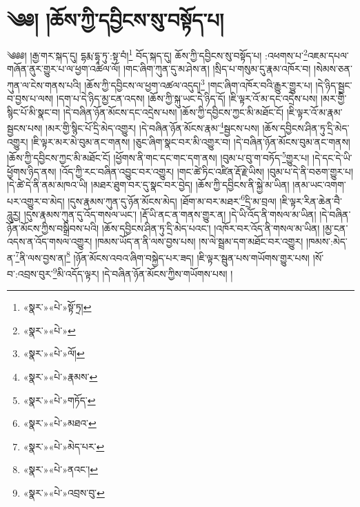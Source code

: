 \chapter{༄༅། །ཆོས་ཀྱི་དབྱིངས་སུ་བསྟོད་པ།}༄༅༅། །རྒྱ་གར་སྐད་དུ། དྷརྨ་དྷཱ་ཏུ་:སྟ་བཾ།\footnote{«སྣར་»«པེ་»སྟོ་ཏྲ།} བོད་སྐད་དུ། ཆོས་ཀྱི་དབྱིངས་སུ་བསྟོད་པ། :འཕགས་པ་\footnote{«སྣར་»«པེ་»}འཇམ་དཔལ་གཞོན་ནུར་གྱུར་པ་ལ་ཕྱག་འཚལ་ལོ། །གང་ཞིག་ཀུན་དུ་མ་ཤེས་ན། །སྲིད་པ་གསུམ་དུ་རྣམ་འཁོར་བ། །སེམས་ཅན་ཀུན་ལ་ངེས་གནས་པའི། །ཆོས་ཀྱི་དབྱིངས་ལ་ཕྱག་འཚལ་འདུད།\footnote{«སྣར་»«པེ་»ལོ།} །གང་ཞིག་འཁོར་བའི་རྒྱུར་གྱུར་པ། །དེ་ཉིད་སྦྱང་བ་བྱས་པ་ལས། །དག་པ་དེ་ཉིད་མྱ་ངན་འདས། །ཆོས་ཀྱི་སྐུ་ཡང་དེ་ཉིད་དོ། །ཇི་ལྟར་འོ་མ་དང་འདྲེས་པས། །མར་གྱི་སྙིང་པོ་མི་སྣང་བ། །དེ་བཞིན་ཉོན་མོངས་དང་འདྲེས་པས། །ཆོས་ཀྱི་དབྱིངས་ཀྱང་མི་མཐོང་ངོ། །ཇི་ལྟར་འོ་མ་རྣམ་སྦྱངས་པས། །མར་གྱི་སྙིང་པོ་དྲི་མེད་འགྱུར། །དེ་བཞིན་ཉོན་མོངས་རྣམ་\footnote{«སྣར་»«པེ་»རྣམས་}སྦྱངས་པས། །ཆོས་དབྱིངས་ཤིན་ཏུ་དྲི་མེད་འགྱུར། །ཇི་ལྟར་མར་མེ་བུམ་ནང་གནས། །ཅུང་ཞིག་སྣང་བར་མི་འགྱུར་བ། །དེ་བཞིན་ཉོན་མོངས་བུམ་ནང་གནས། །ཆོས་ཀྱི་དབྱིངས་ཀྱང་མི་མཐོང་ངོ། །ཕྱོགས་ནི་གང་དང་གང་དག་ནས། །བུམ་པ་བུ་ག་བཏོད་\footnote{«སྣར་»«པེ་»གཏོད་}གྱུར་པ། །དེ་དང་དེ་ཡི་ཕྱོགས་ཉིད་ནས། །འོད་ཀྱི་རང་བཞིན་འབྱུང་བར་འགྱུར། །གང་ཚེ་ཏིང་འཛིན་རྡོ་རྗེ་ཡིས། །བུམ་པ་དེ་ནི་བཅག་གྱུར་པ། །དེ་ཚེ་དེ་ནི་ནམ་མཁའ་ཡི། །མཐར་ཐུག་བར་དུ་སྣང་བར་བྱེད། །ཆོས་ཀྱི་དབྱིངས་ནི་སྐྱེ་མ་ཡིན། །ནམ་ཡང་འགག་པར་འགྱུར་བ་མེད། །དུས་རྣམས་ཀུན་དུ་ཉོན་མོངས་མེད། །ཐོག་མ་བར་མཐར་\footnote{«སྣར་»«པེ་»མཐའ་}དྲི་མ་བྲལ། །ཇི་ལྟར་རིན་ཆེན་བཻ་ཌཱུརྱ། །དུས་རྣམས་ཀུན་དུ་འོད་གསལ་ཡང་། །རྡོ་ཡི་ནང་ན་གནས་གྱུར་ན། །དེ་ཡི་འོད་ནི་གསལ་མ་ཡིན། །དེ་བཞིན་ཉོན་མོངས་ཀྱིས་བསྒྲིབས་པའི། །ཆོས་དབྱིངས་ཤིན་ཏུ་དྲི་མེད་པའང་། །འཁོར་བར་འོད་ནི་གསལ་མ་ཡིན། །མྱ་ངན་འདས་ན་འོད་གསལ་འགྱུར། །ཁམས་ཡོད་ན་ནི་ལས་བྱས་པས། །ས་ལེ་སྦྲམ་དག་མཐོང་བར་འགྱུར། །ཁམས་:མེད་ན་\footnote{«སྣར་»«པེ་»མེད་པར་}ནི་ལས་བྱས་ན།\footnote{«སྣར་»«པེ་»ནའང་།} །ཉོན་མོངས་འབའ་ཞིག་བསྐྱེད་པར་ཟད། །ཇི་ལྟར་སྦུན་པས་གཡོགས་གྱུར་པས། །སོ་བ་:འབྲས་བུར་\footnote{«སྣར་»«པེ་»འབྲས་བུ་}མི་འདོད་ལྟར། །དེ་བཞིན་ཉོན་མོངས་ཀྱིས་གཡོགས་པས། །

